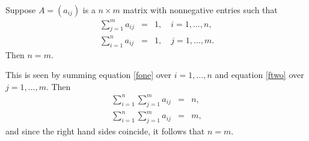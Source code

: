 \documentclass[12pt]{article}
\begin{document}
Suppose $A=(a_{ij})$ is a $n\times m$ matrix with nonnegative entries such 
that 
\begin{eqnarray}
\label{fone}
  \sum_{j=1}^m a_{ij} &=& 1, \quad i=1,\ldots, n, \\
\label{ftwo}
  \sum_{i=1}^n a_{ij} &=& 1, \quad j=1,\ldots, m.
\end{eqnarray}
Then $n=m$. 

This is seen by summing equation
\eqref{fone} over $i=1,\ldots, n$ and 
equation \eqref{ftwo} over $j=1,\ldots, m$. Then
\begin{eqnarray*}
  \sum_{i=1}^n  \sum_{j=1}^m a_{ij} &=& n, \\
  \sum_{i=1}^n  \sum_{j=1}^m a_{ij} &=& m,
\end{eqnarray*}
and since the right hand sides coincide, it follows that $n=m$.
\end{document}
